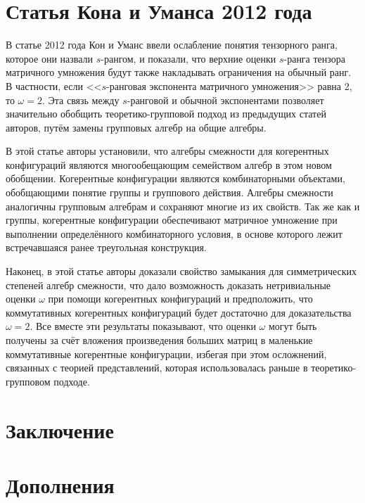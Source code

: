 \documentclass[11pt,a4paper,twoside]{report}
\numberwithin{equation}{section}
\theoremstyle{definition}
\theoremstyle{remark}
\begin{document}
	\chapter{Статья Кона и Уманса 2012 года \cite{Cohn12}}
В статье 2012 года Кон и Уманс ввели ослабление понятия тензорного ранга, которое они назвали $s$-рангом, и показали, что верхние оценки $s$-ранга тензора матричного умножения будут также накладывать ограничения на обычный ранг. В частности, если <<$s$-ранговая экспонента матричного умножения>>	равна 2, то $\omega=2$. Эта связь между $s$-ранговой и обычной экспонентами позволяет значительно обобщить теоретико-групповой подход из предыдущих статей авторов, путём замены групповых алгебр на общие алгебры. 

В этой статье авторы установили, что алгебры смежности для когерентных конфигураций являются многообещающим семейством алгебр в этом новом обобщении. Когерентные конфигурации являются комбинаторными объектами, обобщающими понятие группы и группового действия. Алгебры смежности аналогичны групповым алгебрам и сохраняют многие из их свойств. Так же как и группы, когерентные конфигурации обеспечивают матричное умножение при выполнении определённого комбинаторного условия, в основе которого лежит встречавшаяся ранее треугольная конструкция.

Наконец, в этой статье авторы доказали свойство замыкания для симметрических степеней алгебр смежности, что дало возможность доказать нетривиальные оценки $\omega$ при помощи когерентных конфигураций и предположить, что коммутативных когерентных конфигураций будет достаточно для доказательства $\omega=2$. Все вместе эти результаты показывают, что оценки $\omega$ могут быть получены за счёт вложения произведения больших матриц в маленькие коммутативные когерентные конфигурации, избегая при этом осложнений, связанных с теорией представлений, которая использовалась раньше в теоретико-групповом подходе.
	
	
	
	
	
	
	
	
	\chapter*{Заключение}
	
	
	\chapter{Дополнения}
	\label{appendix}
	
	
	
	
	
	
	\nocite{*}
	
	\printbibliography
\end{document}
